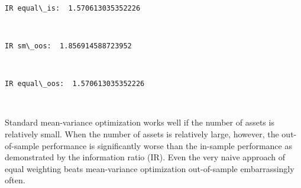 \documentclass[11pt]{article}
\begin{document}
    \begin{center}
    \end{center}
    { \hspace*{\fill} \\}
    
    \begin{Verbatim}[commandchars=\\\{\},fontsize=\footnotesize]
IR equal\_is:  1.570613035352226

    \end{Verbatim}

    \begin{center}
    \end{center}
    { \hspace*{\fill} \\}
    
    \begin{Verbatim}[commandchars=\\\{\},fontsize=\footnotesize]
IR sm\_oos:  1.856914588723952

    \end{Verbatim}

    \begin{center}
    \end{center}
    { \hspace*{\fill} \\}
    
    \begin{Verbatim}[commandchars=\\\{\},fontsize=\footnotesize]
IR equal\_oos:  1.570613035352226

    \end{Verbatim}

    \begin{center}
    \end{center}
    { \hspace*{\fill} \\}
    
    Standard mean-variance optimization works well if the number of assets
is relatively small. When the number of assets is relatively large,
however, the out-of-sample performance is significantly worse than the
in-sample performance as demonstrated by the information ratio (IR).
Even the very naive approach of equal weighting beats mean-variance
optimization out-of-sample embarrassingly often.
\end{document}
